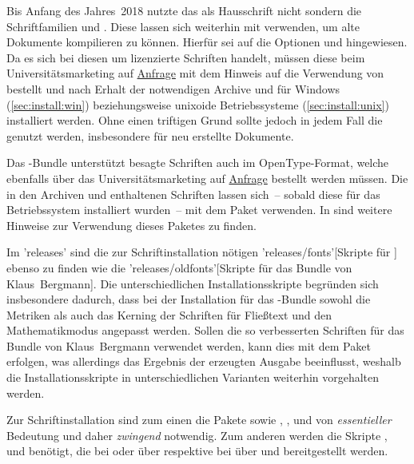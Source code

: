 %
Bis Anfang des Jahres~2018 nutzte das \TUDCD als Hausschrift nicht \OpenSans 
sondern die Schriftfamilien \Univers und \DIN. Diese lassen sich weiterhin mit 
\TUDScript verwenden, um alte Dokumente kompilieren zu können. Hierfür sei auf 
die Optionen  und  hingewiesen. 
Da es sich bei diesen um lizenzierte Schriften handelt, müssen diese beim 
Universitätsmarketing auf \href{https://tu-dresden.de/cd}{Anfrage} mit dem 
Hinweis auf die Verwendung von  bestellt und nach Erhalt der 
notwendigen Archive  und  für 
Windows (\autoref{sec:install:win}) beziehungsweise unixoide Betriebssysteme 
(\autoref{sec:install:unix}) installiert werden. Ohne einen triftigen Grund 
sollte jedoch in jedem Fall die \OpenSans genutzt werden, insbesondere für neu 
erstellte Dokumente.

Das \TUDScript-Bundle unterstützt besagte Schriften auch im OpenType-Format, 
welche ebenfalls über das Universitätsmarketing auf 
\href{https://tu-dresden.de/cd}{Anfrage} bestellt werden müssen. Die in den 
Archiven  und  enthaltenen 
Schriften lassen sich~-- sobald diese für das Betriebssystem installiert 
wurden~-- mit dem Paket  verwenden. In  
sind weitere Hinweise zur Verwendung dieses Paketes zu finden.

Im \GitHubRepo'releases' sind die zur Schriftinstallation nötigen 
\GitHubRepo'releases/fonts'[Skripte für \TUDScript] ebenso zu finden wie die
\GitHubRepo'releases/oldfonts'[Skripte für das Bundle von Klaus~Bergmann]. Die 
unterschiedlichen Installationsskripte begründen sich insbesondere dadurch, 
dass bei der Installation für das \TUDScript-Bundle sowohl die Metriken als 
auch das Kerning der Schriften für Fließtext und den Mathematikmodus angepasst 
werden. Sollen die so verbesserten Schriften für das Bundle von Klaus~Bergmann 
verwendet werden, kann dies mit dem Paket  erfolgen, 
was allerdings das Ergebnis der erzeugten Ausgabe beeinflusst, weshalb die 
Installationsskripte in unterschiedlichen Varianten weiterhin vorgehalten 
werden.



Zur Schriftinstallation sind zum einen die Pakete  sowie 
, ,  und 
 von \emph{essentieller} Bedeutung und daher \emph{zwingend} 
notwendig. Zum anderen werden die Skripte ,  und 
 benötigt, die bei \TeXLive oder \MacTeX über  
respektive bei \MiKTeX über  und  
bereitgestellt werden.


